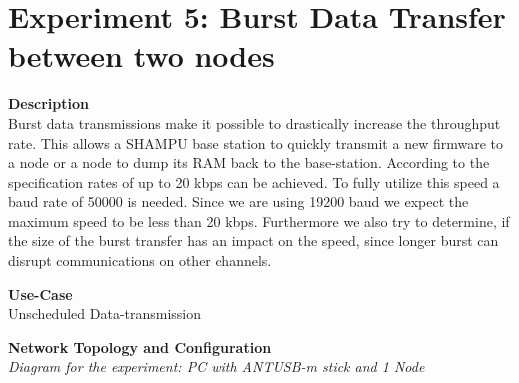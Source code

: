 \section{Experiment 5: Burst Data Transfer between two nodes}
\begin{description} 
	\item{\textbf{Description}} \hfill \\ Burst data transmissions make it possible to drastically increase the throughput rate. This allows a SHAMPU base station to quickly transmit a new firmware to a node or a node to dump its RAM back to the base-station.	According to the  specification rates of up to 20 kbps can be achieved. To fully utilize this speed a baud rate of 50000 is needed. Since we are using 19200 baud we expect the maximum speed to be less than 20 kbps. Furthermore we also try to determine, if the size of the burst transfer has an impact on the speed, since longer burst can disrupt communications on other channels.
	\item{\textbf{Use-Case}} \hfill \\ Unscheduled Data-transmission
	\item{\textbf{Network Topology and Configuration}} \hfill \\ \textit{Diagram for the experiment: PC with ANTUSB-m stick and 1 Node} \\


\end{description}

